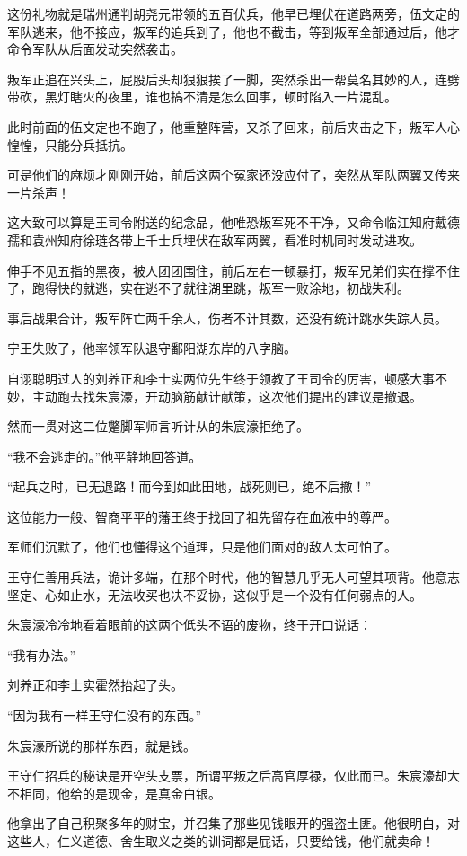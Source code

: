 \begin{multicols}{\theparacolNo}
		这份礼物就是瑞州通判胡尧元带领的五百伏兵，他早已埋伏在道路两旁，伍文定的军队逃来，他不接应，叛军的追兵到了，他也不截击，等到叛军全部通过后，他才命令军队从后面发动突然袭击。

		叛军正追在兴头上，屁股后头却狠狠挨了一脚，突然杀出一帮莫名其妙的人，连劈带砍，黑灯瞎火的夜里，谁也搞不清是怎么回事，顿时陷入一片混乱。

		此时前面的伍文定也不跑了，他重整阵营，又杀了回来，前后夹击之下，叛军人心惶惶，只能分兵抵抗。

		可是他们的麻烦才刚刚开始，前后这两个冤家还没应付了，突然从军队两翼又传来一片杀声！

		这大致可以算是王司令附送的纪念品，他唯恐叛军死不干净，又命令临江知府戴德孺和袁州知府徐琏各带上千士兵埋伏在敌军两翼，看准时机同时发动进攻。

		伸手不见五指的黑夜，被人团团围住，前后左右一顿暴打，叛军兄弟们实在撑不住了，跑得快的就逃，实在逃不了就往湖里跳，叛军一败涂地，初战失利。

		事后战果合计，叛军阵亡两千余人，伤者不计其数，还没有统计跳水失踪人员。

		宁王失败了，他率领军队退守鄱阳湖东岸的八字脑。

		自诩聪明过人的刘养正和李士实两位先生终于领教了王司令的厉害，顿感大事不妙，主动跑去找朱宸濠，开动脑筋献计献策，这次他们提出的建议是撤退。

		然而一贯对这二位蹩脚军师言听计从的朱宸濠拒绝了。

		“我不会逃走的。”他平静地回答道。

		“起兵之时，已无退路！而今到如此田地，战死则已，绝不后撤！”

		这位能力一般、智商平平的藩王终于找回了祖先留存在血液中的尊严。

		军师们沉默了，他们也懂得这个道理，只是他们面对的敌人太可怕了。

		王守仁善用兵法，诡计多端，在那个时代，他的智慧几乎无人可望其项背。他意志坚定、心如止水，无法收买也决不妥协，这似乎是一个没有任何弱点的人。

		朱宸濠冷冷地看着眼前的这两个低头不语的废物，终于开口说话：

		“我有办法。”

		刘养正和李士实霍然抬起了头。

		“因为我有一样王守仁没有的东西。”

		朱宸濠所说的那样东西，就是钱。

		王守仁招兵的秘诀是开空头支票，所谓平叛之后高官厚禄，仅此而已。朱宸濠却大不相同，他给的是现金，是真金白银。

		他拿出了自己积聚多年的财宝，并召集了那些见钱眼开的强盗土匪。他很明白，对这些人，仁义道德、舍生取义之类的训词都是屁话，只要给钱，他们就卖命！


\end{multicols}
